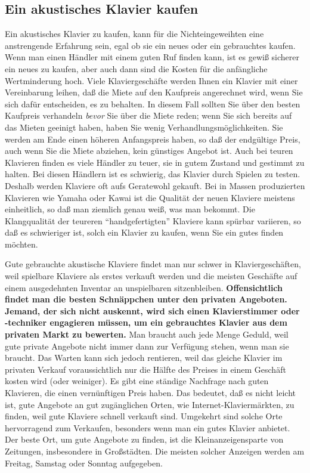 
\subsection{Ein akustisches Klavier kaufen}\hypertarget{c1iii17e}{}

Ein akustisches Klavier zu kaufen, kann für die Nichteingeweihten eine anstrengende Erfahrung sein, egal ob sie ein neues oder ein gebrauchtes kaufen.
Wenn man einen Händler mit einem guten Ruf finden kann, ist es gewiß sicherer ein neues zu kaufen, aber auch dann sind die Kosten für die anfängliche Wertminderung hoch.
Viele Klaviergeschäfte werden Ihnen ein Klavier mit einer Vereinbarung leihen, daß die Miete auf den Kaufpreis angerechnet wird, wenn Sie sich dafür entscheiden, es zu behalten.
In diesem Fall sollten Sie über den besten Kaufpreis verhandeln \textit{bevor} Sie über die Miete reden; wenn Sie sich bereits auf das Mieten geeinigt haben, haben Sie wenig Verhandlungsmöglichkeiten.
Sie werden am Ende einen höheren Anfangspreis haben, so daß der endgültige Preis, auch wenn Sie die Miete abziehen, kein günstiges Angebot ist.
Auch bei teuren Klavieren finden es viele Händler zu teuer, sie in gutem Zustand und gestimmt zu halten.
Bei diesen Händlern ist es schwierig, das Klavier durch Spielen zu testen.
Deshalb werden Klaviere oft aufs Geratewohl gekauft.
Bei in Massen produzierten Klavieren wie Yamaha oder Kawai ist die Qualität der neuen Klaviere meistens einheitlich, so daß man ziemlich genau weiß, was man bekommt.
Die Klangqualität der teureren \enquote{handgefertigten} Klaviere kann spürbar variieren, so daß es schwieriger ist, solch ein Klavier zu kaufen, wenn Sie ein gutes finden möchten.

Gute gebrauchte akustische Klaviere findet man nur schwer in Klaviergeschäften, weil spielbare Klaviere als erstes verkauft werden und die meisten Geschäfte auf einem ausgedehnten Inventar an unspielbaren sitzenbleiben.
\textbf{Offensichtlich findet man die besten Schnäppchen unter den privaten Angeboten.
Jemand, der sich nicht auskennt, wird sich einen Klavierstimmer oder -techniker engagieren müssen, um ein gebrauchtes Klavier aus dem privaten Markt zu bewerten.}
Man braucht auch jede Menge Geduld, weil gute private Angebote nicht immer dann zur Verfügung stehen, wenn man sie braucht.
Das Warten kann sich jedoch rentieren, weil das gleiche Klavier im privaten Verkauf voraussichtlich nur die Hälfte des Preises in einem Geschäft kosten wird (oder weiniger).
Es gibt eine ständige Nachfrage nach guten Klavieren, die einen vernünftigen Preis haben.
Das bedeutet, daß es nicht leicht ist, gute Angebote an gut zugänglichen Orten, wie Internet-Klaviermärkten, zu finden, weil gute Klaviere schnell verkauft sind.
Umgekehrt sind solche Orte hervorragend zum Verkaufen, besonders wenn man ein gutes Klavier anbietet.
Der beste Ort, um gute Angebote zu finden, ist die Kleinanzeigensparte von Zeitungen, insbesondere in Großstädten.
Die meisten solcher Anzeigen werden am Freitag, Samstag oder Sonntag aufgegeben.

